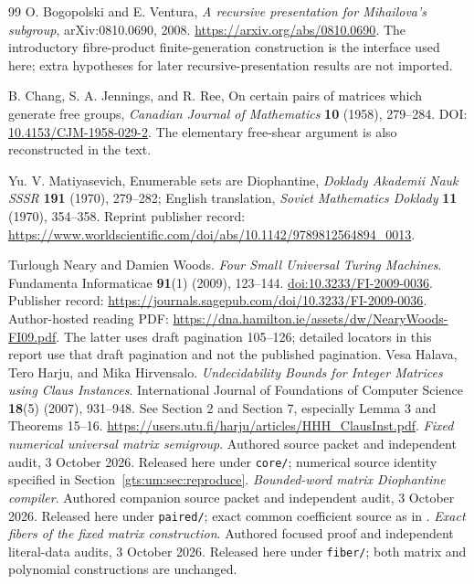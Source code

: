\documentclass[11pt,letterpaper]{article}
\theoremstyle{definition}
\theoremstyle{remark}
\newcommand{\code}[1]{\nolinkurl{#1}}
\begin{document}
\begin{thebibliography}{99}
O. Bogopolski and E. Ventura, \emph{A recursive presentation for Mihailova's subgroup}, arXiv:0810.0690, 2008. \url{https://arxiv.org/abs/0810.0690}. The introductory fibre-product finite-generation construction is the interface used here; extra hypotheses for later recursive-presentation results are not imported.

B. Chang, S. A. Jennings, and R. Ree, On certain pairs of matrices which generate free groups, \emph{Canadian Journal of Mathematics} \textbf{10} (1958), 279--284. DOI: \href{https://doi.org/10.4153/CJM-1958-029-2}{10.4153/CJM-1958-029-2}. The elementary free-shear argument is also reconstructed in the text.

Yu. V. Matiyasevich, Enumerable sets are Diophantine, \emph{Doklady Akademii Nauk SSSR} \textbf{191} (1970), 279--282; English translation, \emph{Soviet Mathematics Doklady} \textbf{11} (1970), 354--358. Reprint publisher record: \url{https://www.worldscientific.com/doi/abs/10.1142/9789812564894_0013}.


 Turlough Neary and Damien Woods.
\emph{Four Small Universal Turing Machines}.
Fundamenta Informaticae \textbf{91}(1) (2009), 123--144.
\href{https://doi.org/10.3233/FI-2009-0036}{doi:10.3233/FI-2009-0036}.
Publisher record: \url{https://journals.sagepub.com/doi/10.3233/FI-2009-0036}.
Author-hosted reading PDF: \url{https://dna.hamilton.ie/assets/dw/NearyWoods-FI09.pdf}.
The latter uses draft pagination 105--126; detailed locators in this report use that draft pagination and not the published pagination.
 Vesa Halava, Tero Harju, and Mika Hirvensalo.
\emph{Undecidability Bounds for Integer Matrices using Claus Instances}.
International Journal of Foundations of Computer Science \textbf{18}(5) (2007), 931--948.
See Section 2 and Section 7, especially Lemma 3 and Theorems 15--16.
\url{https://users.utu.fi/harju/articles/HHH_ClausInst.pdf}.
 \emph{Fixed numerical universal matrix semigroup}.
Authored source packet and independent audit, 3 October 2026.
Released here under \code{core/}; numerical source identity specified in Section~\ref{gts:um:sec:reproduce}.
 \emph{Bounded-word matrix Diophantine compiler}.
Authored companion source packet and independent audit, 3 October 2026.
Released here under \code{paired/}; exact common coefficient source as in \cite{um-Core}.
 \emph{Exact fibers of the fixed matrix construction}.
Authored focused proof and independent literal-data audits, 3 October 2026.
Released here under \code{fiber/}; both matrix and polynomial constructions are unchanged.



\end{thebibliography}
\end{document}
